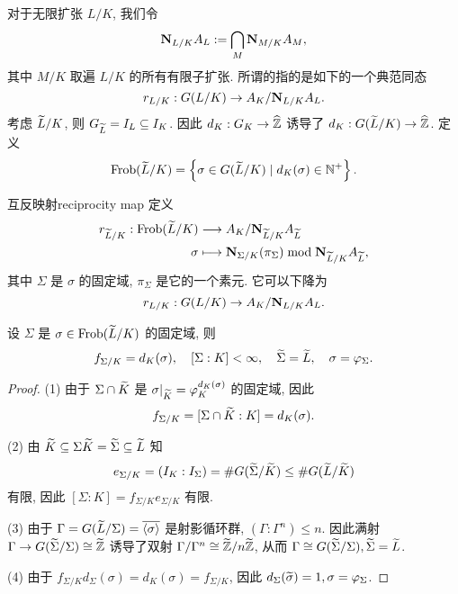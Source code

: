 对于无限扩张 $L/K$, 我们令
  \[{\mathbf{N}}_{L/K}A_L:=\bigcap_M {\mathbf{N}}_{M/K}A_M,\]
其中 $M/K$ 取遍 $L/K$ 的所有有限子扩张. 
所谓的指的是如下的一个典范同态
  \[r_{L/K}:G(L/K)\to A_K/{\mathbf{N}}_{L/K}A_L.\]
考虑 $\widetilde L/K$, 则 $G_{\widetilde L}=I_L\subseteq I_K$. 因此 $d_K:G_K\to\widehat{{\mathbb{Z}}}$ 诱导了 $d_K:G(\widetilde L/K)\to \widehat {{\mathbb{Z}}}$.
定义
  \[{\mathrm{Frob}}(\widetilde L/K)=\left\{\sigma\in G(\widetilde L/K)\mid d_K(\sigma)\in {\mathbb{N}}^+\right\}.\]

\begin{theorem}{互反映射}{reciprocity map}
定义
  \[\begin{split}r_{\widetilde L/K}:{\mathrm{Frob}}(\widetilde L/K) &\longrightarrow A_K/{\mathbf{N}}_{\widetilde L/K}A_{\widetilde L} \\ \sigma &\longmapsto {\mathbf{N}}_{\Sigma/K}(\pi_\Sigma)\bmod {\mathbf{N}}_{\widetilde L/K}A_{\widetilde L},\end{split}\]
其中 $\Sigma$ 是 $\sigma$ 的固定域, $\pi_\Sigma$ 是它的一个素元. 它可以下降为
  \[r_{L/K}:G(L/K)\to A_K/{\mathbf{N}}_{L/K}A_L.\]
\end{theorem}

\begin{lemma}{}{}
设 $\Sigma$ 是 $\sigma\in{\mathrm{Frob}}(\widetilde L/K)$ 的固定域, 则
  \[f_{\Sigma/K}=d_K(\sigma),\quad
[\Sigma:K]<\infty,\quad
\widetilde\Sigma=\widetilde L,\quad
\sigma=\varphi_\Sigma.\]
\end{lemma}
\begin{proof}
(1) 由于 $\Sigma\cap \widetilde K$ 是 $\sigma|_{\widetilde K}=\varphi_K^{d_K(\sigma)}$ 的固定域, 因此 
  \[f_{\Sigma/K}=[\Sigma\cap \widetilde K:K]=d_K(\sigma).\]

(2) 由 $\widetilde K\subseteq \Sigma \widetilde K=\widetilde \Sigma\subseteq \widetilde L$ 知
  \[e_{\Sigma/K}=(I_K:I_\Sigma)=\# G(\widetilde \Sigma/\widetilde K)\le \# G(\widetilde L/\widetilde K)\]
有限, 因此 $[\Sigma:K]=f_{\Sigma/K}e_{\Sigma/K}$ 有限.

(3) 由于 $\Gamma=G(\widetilde L/\Sigma)=\overline{\langle{\sigma}\rangle}$ 是射影循环群, $(\Gamma:\Gamma^n)\le n$. 因此满射 $\Gamma\to G(\widetilde \Sigma/\Sigma)\cong\widetilde {{\mathbb{Z}}}$ 诱导了双射 $\Gamma/\Gamma^n\cong\widetilde {{\mathbb{Z}}}/n\widetilde{{\mathbb{Z}}}$, 从而 $\Gamma\cong G(\widetilde \Sigma/\Sigma),\widetilde \Sigma=\widetilde L$.

(4) 由于 $f_{\Sigma/K}d_\Sigma(\sigma)=d_K(\sigma)=f_{\Sigma/K}$, 因此 $d_\Sigma(\widetilde \sigma)=1,\sigma=\varphi_\Sigma$.
\end{proof}

